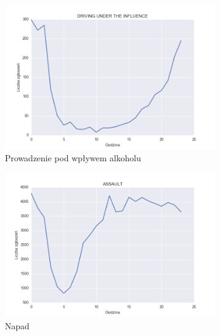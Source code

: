 \documentclass[11pt]{article} %
\begin{document}
\begin{figure}[!h]
\centering
   \begin{subfigure}{0.48\linewidth}
   \centering
   \includegraphics[width=\linewidth]{images/crimes_per_hour/6}
   \caption{Prowadzenie pod wpływem alkoholu}
   \label{fig:crimes_per_hour_1} 
\end{subfigure}
\hfill
\begin{subfigure}{0.48\linewidth}
   \centering
   \includegraphics[width=\linewidth]{images/crimes_per_hour/1}
   \caption{Napad}
   \label{fig:crimes_per_hour_2}
\end{subfigure}
\\[\baselineskip]
\begin{subfigure}{0.48\linewidth}
   \centering

\end{subfigure}
\end{figure}
\end{document}
